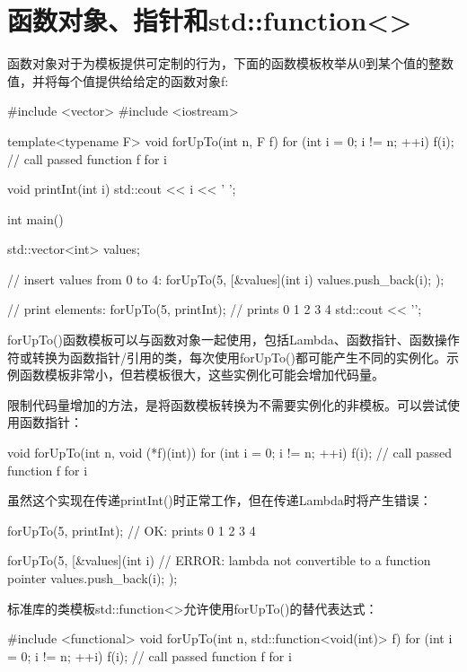 \section{函数对象、指针和std::function<>}

函数对象对于为模板提供可定制的行为，下面的函数模板枚举从0到某个值的整数值，并将每个值提供给给定的函数对象f:

\begin{cpp}
#include <vector>
#include <iostream>

template<typename F>
void forUpTo(int n, F f)
{
	for (int i = 0; i != n; ++i)
	{
		f(i); // call passed function f for i
	}
}

void printInt(int i)
{
	std::cout << i << ' ';
}

int main()
{
	std::vector<int> values;
	
	// insert values from 0 to 4:
	forUpTo(5,
	[&values](int i) {
		values.push_back(i);
	});

	// print elements:
	forUpTo(5,
			printInt); // prints 0 1 2 3 4
	std::cout << '\n';
}
\end{cpp}

forUpTo()函数模板可以与函数对象一起使用，包括Lambda、函数指针、函数操作符或转换为函数指针/引用的类，每次使用forUpTo()都可能产生不同的实例化。示例函数模板非常小，但若模板很大，这些实例化可能会增加代码量。

限制代码量增加的方法，是将函数模板转换为不需要实例化的非模板。可以尝试使用函数指针：

\begin{cpp}
void forUpTo(int n, void (*f)(int))
{
	for (int i = 0; i != n; ++i)
	{
		f(i); // call passed function f for i
	}
}
\end{cpp}

虽然这个实现在传递printInt()时正常工作，但在传递Lambda时将产生错误：

\begin{cpp}
forUpTo(5,
printInt); // OK: prints 0 1 2 3 4

forUpTo(5,
		[&values](int i) { // ERROR: lambda not convertible to a function pointer
			values.push_back(i);
		});
\end{cpp}

标准库的类模板std::function<>允许使用forUpTo()的替代表达式：

\begin{cpp}
#include <functional>
void forUpTo(int n, std::function<void(int)> f)
{
	for (int i = 0; i != n; ++i)
	{
		f(i); // call passed function f for i
	}
}
\end{cpp}

